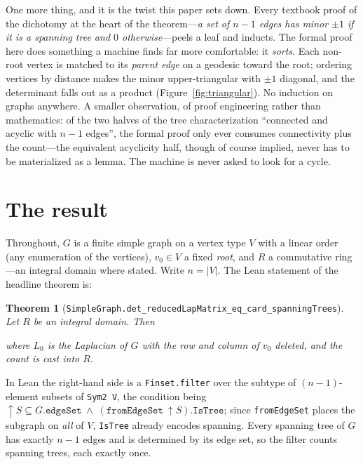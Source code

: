 \documentclass[11pt]{article}
\newtheorem{theorem}{Theorem}
\newcommand{\lean}[1]{\texttt{#1}}
\newcommand{\keyeq}[1]{\begin{center}\keybox{$\displaystyle #1$}\end{center}}
\begin{document}
One more thing, and it is the twist this paper sets down. Every textbook proof of the dichotomy
at the heart of the theorem---\emph{a set of $n-1$ edges has minor $\pm1$ if it is a spanning
tree and $0$ otherwise}---peels a leaf and inducts. The formal proof here does something a
machine finds far more comfortable: it \emph{sorts}. Each non-root vertex is matched to its
\emph{parent edge} on a geodesic toward the root; ordering vertices by distance makes the minor
upper-triangular with $\pm1$ diagonal, and the determinant falls out as a product
(Figure~\ref{fig:triangular}). No induction on graphs anywhere. A smaller observation, of
proof engineering rather than mathematics: of the two halves of the tree characterization
``connected and acyclic with $n-1$ edges'', the formal proof only ever consumes connectivity
plus the count---the equivalent acyclicity half, though of course implied, never has to be
materialized as a lemma. The machine is never asked to look for a cycle.

\section{The result}
\label{sec:result}

Throughout, $G$ is a finite simple graph on a vertex type $V$ with a linear order (any
enumeration of the vertices), $v_0\in V$ a fixed \emph{root}, and $R$ a commutative ring---an
integral domain where stated. Write $n=|V|$. The Lean statement of the headline theorem is:

\begin{theorem}[{\lean{SimpleGraph.det\_reducedLapMatrix\_eq\_card\_spanningTrees}}]
\label{thm:kirchhoff}
Let $R$ be an integral domain. Then
\keyeq{\det L_0 \;=\; \#\Bigl\{\,S\subseteq\mathrm{Sym}^2 V \;:\; |S|=n-1,\;
S\subseteq E(G),\; (V,S)\ \text{is a tree}\,\Bigr\}}
where $L_0$ is the Laplacian of $G$ with the row and column of $v_0$ deleted, and the count is
cast into $R$.
\end{theorem}

In Lean the right-hand side is a \lean{Finset.filter} over the subtype of
$(n-1)$-element subsets of \lean{Sym2 V}, the condition being
$\uparrow\!S\subseteq G.\lean{edgeSet}\;\wedge\;(\lean{fromEdgeSet}\ \uparrow\!S).\lean{IsTree}$;
since \lean{fromEdgeSet} places the subgraph on \emph{all} of $V$, \lean{IsTree} already
encodes spanning. Every spanning tree of $G$ has exactly $n-1$ edges and is determined by its
edge set, so the filter counts spanning trees, each exactly once.
\end{document}
